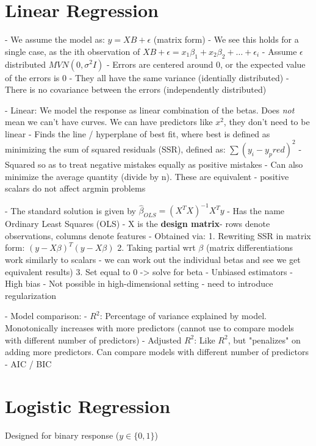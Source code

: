 \documentclass{article}
\begin{document}
\section{Linear Regression}

- We assume the model as: $y = XB + \epsilon$ (matrix form)
	- We see this holds for a single case, as the ith observation of $XB + \epsilon = x_1 \beta_1 + x_2 \beta_2 + \ldots + \epsilon_i$
	- Assume $\epsilon$ distributed $MVN(0, \sigma^2 I)$
		- Errors are centered around 0, or the expected value of the errors is 0
		- They all have the same variance (identially distributed)
		- There is no covariance between the errors (independently distributed)

- Linear: We model the response as linear combination of the betas. Does \textit{not} mean we can't have curves. We can have predictors like $x^2$, they don't need to be linear
- Finds the line / hyperplane of best fit, where best is defined as minimizing the sum of squared residuals (SSR), defined as: $\sum (y_i - y_pred) ^ 2$
	- Squared so as to treat negative mistakes equally as positive mistakes
	- Can also minimize the average quantity (divide by n). These are equivalent - positive scalars do not affect argmin problems

- The standard solution is given by $\hat{\beta}_{OLS} = (X^T X)^{-1} X^T y$
	- Has the name Ordinary Least Squares (OLS)
	- X is the \textbf{design matrix}- rows denote observations, columns denote features
	- Obtained via:
		1. Rewriting SSR in matrix form: $(y - X\beta)^T (y - X\beta)$
		2. Taking partial wrt $\beta$ (matrix differentiations work similarly to scalars - we can work out the individual betas and see we get equivalent results)
		3. Set equal to 0 -> solve for beta
	- Unbiased estimators
- High bias
- Not possible in high-dimensional setting - need to introduce regularization

- Model comparison:
	- $R^2$: Percentage of variance explained by model. Monotonically increases with more predictors (cannot use to compare models with different number of predictors)
	- Adjusted $R^2$: Like $R^2$, but "penalizes" on adding more predictors. Can compare models with different number of predictors
	- AIC / BIC

\section{Logistic Regression}


Designed for binary response ($y \in  \{0, 1\}$)
\end{document}
